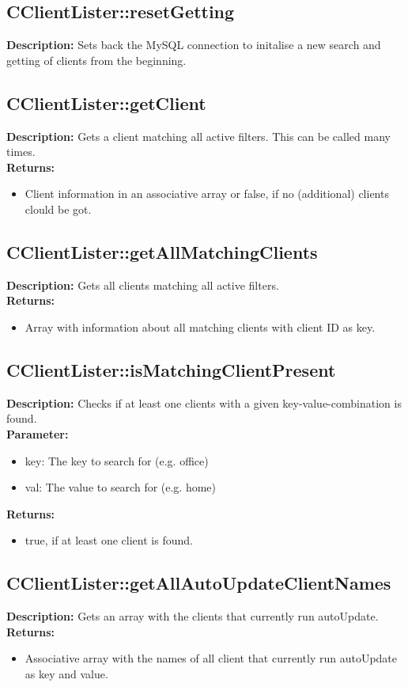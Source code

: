 \subsection{CClientLister::resetGetting}
\textbf{Description:} Sets back the MySQL connection to initalise a new search and getting of clients from the beginning.\\

\subsection{CClientLister::getClient}
\textbf{Description:} Gets a client matching all active filters. This can be called many times.\\
\textbf{Returns:}
\begin{itemize}
\item Client information in an associative array or false, if no (additional) clients clould be got.
\end{itemize}

\subsection{CClientLister::getAllMatchingClients}
\textbf{Description:} Gets all clients matching all active filters.\\
\textbf{Returns:}
\begin{itemize}
\item Array with information about all matching clients with client ID as key.
\end{itemize}

\subsection{CClientLister::isMatchingClientPresent}
\textbf{Description:} Checks if at least one clients with a given key-value-combination is found.\\
\textbf{Parameter:}
\begin{itemize}
\item key: The key to search for (e.g. office)
\item val: The value to search for (e.g. home)
\end{itemize}
\textbf{Returns:}
\begin{itemize}
\item true, if at least one client is found.
\end{itemize}

\subsection{CClientLister::getAllAutoUpdateClientNames}
\textbf{Description:} Gets an array with the clients that currently run autoUpdate.\\
\textbf{Returns:}
\begin{itemize}
\item Associative array with the names of all client that currently run autoUpdate as key and value.
\end{itemize}

